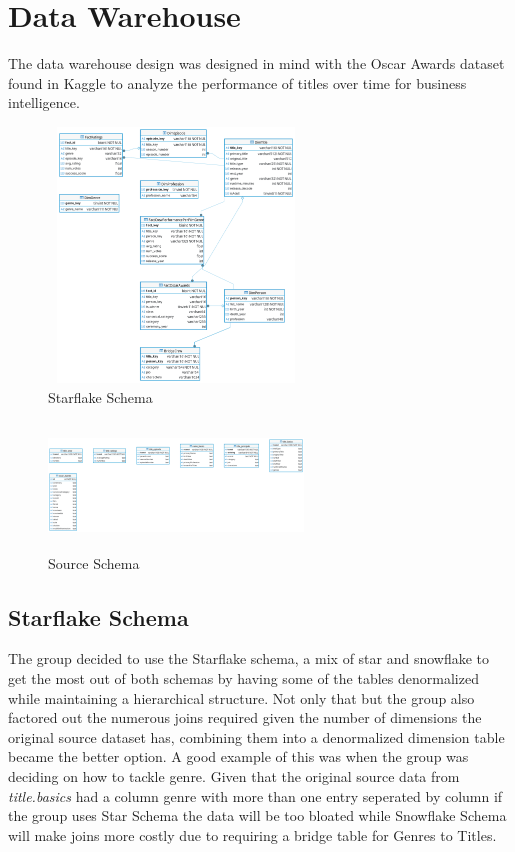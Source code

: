 \section{Data Warehouse}
The data warehouse design was designed in mind with the Oscar Awards dataset found in Kaggle to analyze the performance of titles over time for business intelligence. 
\begin{figure}[ht]
\includegraphics[height=256px, width=256px]{imdb.png}
\caption{Starflake Schema}
\end{figure}

\begin{figure}[ht]
	\includegraphics[height=128px,width=256px]{imdb_source.png}
	\caption{Source Schema}
\end{figure}
\subsection{Starflake Schema}
The group decided to use the Starflake schema, a mix of star and snowflake to get the most out of both schemas by having some of the tables denormalized while maintaining a hierarchical structure.  Not only that but the group also factored out the numerous joins required given the number of dimensions the original source dataset has, combining them into a denormalized dimension table became the better option. A good example of this was when the group was deciding on how to tackle genre. Given that the original source data from \textit{title.basics} had a column genre with more than one entry seperated by column if the group uses Star Schema the data will be too bloated while Snowflake Schema will make joins more costly due to requiring a bridge table for Genres to Titles. 
